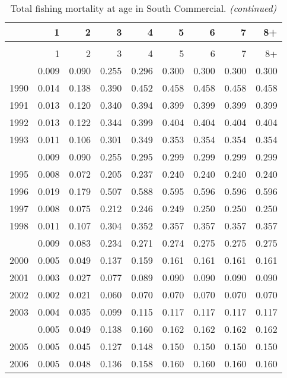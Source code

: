 \documentclass[
]{article}
\begin{document}
\begin{longtable}[t]{lrrrrrrrr}
\caption{\label{tab:South_Commercial-fleet-FAA-table}Total fishing mortality at age in South Commercial.}\\
\toprule
  & 1 & 2 & 3 & 4 & 5 & 6 & 7 & 8+\\
\midrule
\endfirsthead
\caption[]{Total fishing mortality at age in South Commercial. \textit{(continued)}}\\
\toprule
  & 1 & 2 & 3 & 4 & 5 & 6 & 7 & 8+\\
\midrule
\endhead

\endfoot
\bottomrule
\endlastfoot
1989 & 0.009 & 0.090 & 0.255 & 0.296 & 0.300 & 0.300 & 0.300 & 0.300\\
1990 & 0.014 & 0.138 & 0.390 & 0.452 & 0.458 & 0.458 & 0.458 & 0.458\\
1991 & 0.013 & 0.120 & 0.340 & 0.394 & 0.399 & 0.399 & 0.399 & 0.399\\
1992 & 0.013 & 0.122 & 0.344 & 0.399 & 0.404 & 0.404 & 0.404 & 0.404\\
1993 & 0.011 & 0.106 & 0.301 & 0.349 & 0.353 & 0.354 & 0.354 & 0.354\\
\addlinespace
1994 & 0.009 & 0.090 & 0.255 & 0.295 & 0.299 & 0.299 & 0.299 & 0.299\\
1995 & 0.008 & 0.072 & 0.205 & 0.237 & 0.240 & 0.240 & 0.240 & 0.240\\
1996 & 0.019 & 0.179 & 0.507 & 0.588 & 0.595 & 0.596 & 0.596 & 0.596\\
1997 & 0.008 & 0.075 & 0.212 & 0.246 & 0.249 & 0.250 & 0.250 & 0.250\\
1998 & 0.011 & 0.107 & 0.304 & 0.352 & 0.357 & 0.357 & 0.357 & 0.357\\
\addlinespace
1999 & 0.009 & 0.083 & 0.234 & 0.271 & 0.274 & 0.275 & 0.275 & 0.275\\
2000 & 0.005 & 0.049 & 0.137 & 0.159 & 0.161 & 0.161 & 0.161 & 0.161\\
2001 & 0.003 & 0.027 & 0.077 & 0.089 & 0.090 & 0.090 & 0.090 & 0.090\\
2002 & 0.002 & 0.021 & 0.060 & 0.070 & 0.070 & 0.070 & 0.070 & 0.070\\
2003 & 0.004 & 0.035 & 0.099 & 0.115 & 0.117 & 0.117 & 0.117 & 0.117\\
\addlinespace
2004 & 0.005 & 0.049 & 0.138 & 0.160 & 0.162 & 0.162 & 0.162 & 0.162\\
2005 & 0.005 & 0.045 & 0.127 & 0.148 & 0.150 & 0.150 & 0.150 & 0.150\\
2006 & 0.005 & 0.048 & 0.136 & 0.158 & 0.160 & 0.160 & 0.160 & 0.160\\

\end{longtable}
\end{document}
